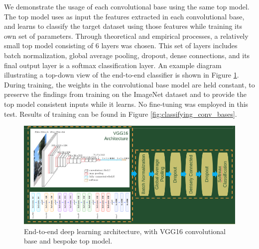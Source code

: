We demonstrate the usage of each convolutional base using the same top model.
The top model uses as input the features extracted in each convolutional base, and learns to classify the target dataset using those features while training its own set of parameters.
Through theoretical and empirical processes, a relatively small top model consisting of 6 layers was chosen.
This set of layers includes batch normalization, global average pooling, dropout, dense connections, and its final output layer is a softmax classification layer.
An example diagram illustrating a top-down view of the end-to-end classifier is shown in Figure \ref{fig:classifying_architecture}.
During training, the weights in the convolutional base model are held constant, to preserve the findings from training on the ImageNet dataset and to provide the top model consistent inputs while it learns.
No fine-tuning was employed in this test.
Results of training can be found in Figure \ref{fig:classifying_conv_bases}.

\begin{figure}[ht]
	\includegraphics[width=\textwidth]{./thesis_code/vgg16_top_model.png}
	\caption{End-to-end deep learning architecture, with VGG16 convolutional base and bespoke top model.}
	\label{fig:classifying_architecture}
\end{figure}


